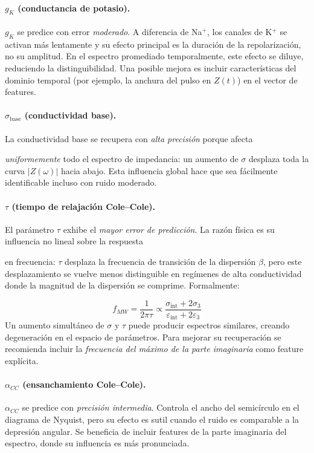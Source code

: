 \documentclass[12pt]{article}
\begin{document}
\paragraph{$g_K$ (conductancia de potasio).} $g_K$ se predice con error \emph{moderado}. A
diferencia de Na$^+$, los canales de K$^+$
se activan m\'as lentamente y su efecto principal es la duraci\'on de la repolarizaci\'on, no
su amplitud. En el espectro promediado temporalmente, este efecto se diluye, reduciendo
la distinguibilidad. Una posible mejora es incluir caracter\'isticas del dominio temporal
(por ejemplo, la anchura del pulso en $Z(t)$) en el vector de features.

\paragraph{$\sigma_{\text{base}}$ (conductividad base).}

La conductividad base se recupera con \emph{alta precisi\'on} porque afecta

\emph{uniformemente} todo el espectro de impedancia: un aumento de $\sigma$ desplaza toda
la curva $|Z(\omega)|$ hacia abajo. Esta influencia global hace que sea f\'acilmente
identificable incluso con ruido moderado.

\paragraph{$\tau$ (tiempo de relajaci\'on Cole--Cole).} El par\'ametro $\tau$ exhibe el
\emph{mayor error de predicci\'on}. La raz\'on f\'isica es su influencia no lineal sobre la respuesta

en frecuencia: $\tau$ desplaza la frecuencia de transici\'on de la dispersi\'on $\beta$, pero este
desplazamiento se vuelve menos
distinguible en reg\'imenes de alta conductividad donde la magnitud de la dispersi\'on se
comprime. Formalmente:

\begin{equation}
f_{MW} = \frac{1}{2\pi\tau} \propto \frac{\sigma_{\text{int}} + 2\sigma_3}
{\varepsilon_{\text{int}} + 2\varepsilon_3}
\end{equation}
Un aumento simult\'aneo de $\sigma$ y $\tau$ puede producir espectros similares, creando
degeneraci\'on en el espacio de par\'ametros. Para mejorar su recuperaci\'on se recomienda
incluir la \emph{frecuencia del m\'aximo de la parte imaginaria} como feature expl\'icita.

\paragraph{$\alpha_{CC}$ (ensanchamiento Cole--Cole).} $\alpha_{CC}$ se predice con
\emph{precisi\'on intermedia}. Controla el ancho del
semic\'irculo en el diagrama de Nyquist, pero su efecto es sutil cuando el ruido es
comparable a la depresi\'on angular. Se beneficia de incluir features de la parte imaginaria
del espectro, donde su influencia es m\'as pronunciada.
\end{document}
